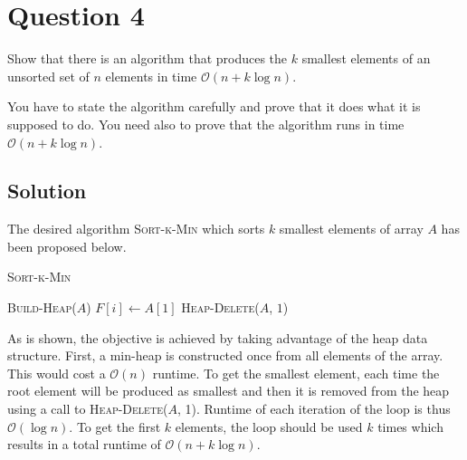 
\section*{Question 4}

Show that there is an algorithm that produces the $k$ smallest elements of an unsorted set of $n$ elements in time $\mathcal{O}(n + k \log n)$.

You have to state the algorithm carefully and prove that it does what it is supposed to do.
You need also to prove that the algorithm runs in time $\mathcal{O}(n + k \log n)$.

\subsection*{Solution}

The desired algorithm \textsc{Sort-k-Min} which sorts $k$ smallest elements of array $A$ has been proposed below.

\begin{algorithm}[H]
\caption{\textsc{Sort-k-Min}}
\begin{algorithmic}[1]
\State \textsc{Build-Heap}($A$)
\State $F[i] \leftarrow A[1]$
\State \textsc{Heap-Delete}($A$, $1$)
\EndFor
\end{algorithmic}
\end{algorithm}

As is shown, the objective is achieved by taking advantage of the heap data structure.
First, a min-heap is constructed once from all elements of the array.
This would cost a $\mathcal{O}(n)$ runtime.
To get the smallest element, each time the root element will be produced as smallest and then it is removed from the heap using a call to \textsc{Heap-Delete}($A$, 1).
Runtime of each iteration of the loop is thus $\mathcal{O}(\log n)$.
To get the first $k$ elements, the loop should be used $k$ times which results in a total runtime of $\mathcal{O}(n + k\log n)$.
